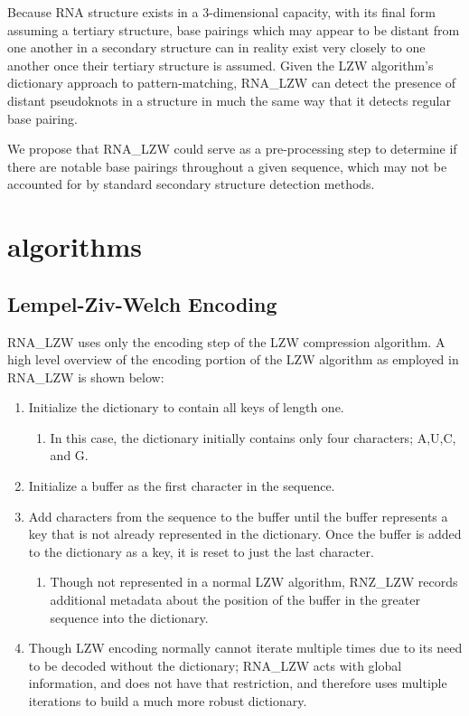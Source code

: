 \documentclass[sigconf]{acmart}
\begin{document}
Because RNA structure exists in a 3-dimensional capacity, with its final form assuming a tertiary structure, base pairings which may appear to be distant from one another in a secondary structure can in reality exist very closely to one another once their tertiary structure is assumed. Given the LZW algorithm’s dictionary approach to pattern-matching,  RNA\_LZW can detect the presence of distant pseudoknots in a structure in much the same way that it detects regular base pairing. 

We propose that RNA\_LZW could serve as a pre-processing step to determine if there are notable base pairings throughout a given sequence, which may not be accounted for by standard secondary structure detection methods.

\section{algorithms}


\subsection{Lempel-Ziv-Welch Encoding}

RNA\_LZW uses only the encoding step of the LZW compression algorithm.  A high level overview of the encoding portion of the LZW algorithm as employed in RNA\_LZW is shown below:

\begin{enumerate}
\item Initialize the dictionary to contain all keys of length one. 
	\begin{enumerate}
		\item In this case, the dictionary initially contains only four characters; A,U,C, and G. 
	\end{enumerate}
\item Initialize a buffer as the first character in the sequence.
\item Add characters from the sequence to the buffer until the buffer represents a key that is not already represented in the dictionary. Once the buffer is added to the dictionary as a key, it is reset to just the last character.
	\begin{enumerate}
		\item Though not represented in a normal LZW algorithm, RNZ\_LZW records additional metadata about the position of the buffer in the greater sequence into the dictionary.
	\end{enumerate}
\item Though LZW encoding normally cannot iterate multiple times due to its need to be decoded without the dictionary; RNA\_LZW acts with global information, and does not have that restriction, and therefore uses multiple iterations to build a much more robust dictionary.
\end{enumerate}
\end{document}
